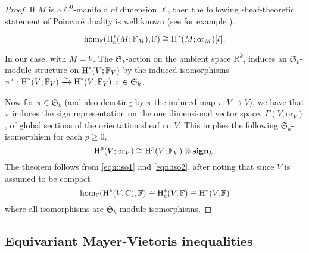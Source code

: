 \documentclass{amsart}
\theoremstyle{definition}
\theoremstyle{remark}
\numberwithin{equation}{section}
\begin{document}
\begin{proof}
If $M$ is a $C^0$-manifold of dimension $\ell$, then the following sheaf-theoretic statement
of Poincar\'e duality is well known (see for example \cite[Corollary 5.5.6]{Schapira-notes}).

\begin{equation}
\label{eqn:iso1}
{\textrm{hom}}_{\mathbb{F}}({\mbox{\rm H}}^*_c(M;{\mathbb{F}}_M),{\mathbb{F}})  \cong {\mbox{\rm H}}^*(M;\mathrm{or}_M)[\ell].
\end{equation}

In our case, with $M=V$.  The $\mathfrak{S}_k$-action on the ambient space ${\mathrm{R}}^k$, induces
an $\mathfrak{S}_k$-module structure on ${\mbox{\rm H}}^*(V;{\mathbb{F}}_V)$ by the induced isomorphisms
$\pi^*: {\mbox{\rm H}}^*(V;{\mathbb{F}}_V) \xrightarrow{\sim} {\mbox{\rm H}}^*(V;{\mathbb{F}}_V), \pi \in \mathfrak{S}_k$.

Now for $\pi \in \mathfrak{S}_k$ (and also denoting by $\pi$ the induced map $\pi:V \rightarrow V$), we have that $\pi$ induces the sign representation 
on the  
one dimensional vector space, $\Gamma(V; \mathrm{or}_V)$,  of global sections of the orientation sheaf on $V$.  
This implies the following $\mathfrak{S}_k$-isomorphism for each $p \geq 0$,
\begin{equation}
\label{eqn:iso2}
{\mbox{\rm H}}^p(V;\mathrm{or}_V) \cong {\mbox{\rm H}}^p(V;{\mathbb{F}}_V) \otimes 
\textbf{sign}_k.
\end{equation}
The theorem follows from \eqref{eqn:iso1} and \eqref{eqn:iso2}, after noting that since $V$ is assumed to be compact
\[
{\textrm{hom}}_{\mathbb{F}}({\mbox{\rm H}}^*(V,{\mathrm{C}}),{\mathbb{F}}) \cong {\mbox{\rm H}}^*_c(V,{\mathbb{F}}) \cong  {\mbox{\rm H}}^*(V,{\mathbb{F}}) 
\]
where all isomorphisms are $\mathfrak{S}_k$-module isomorphisms.
\end{proof}

\subsection{Equivariant Mayer-Vietoris inequalities}
\end{document}
